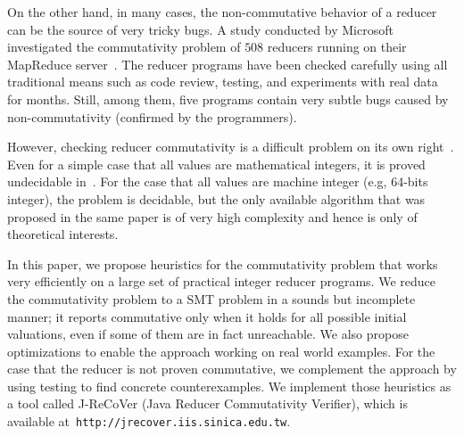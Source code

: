 \documentclass{llncs}
\newcommand{\hide}[1]{}
\begin{document}
\hide{More concretely, for the verification of a MapReduce program, we propose to do it in two phases. First, ensuring if all reducers are commutative. If some reducers are non-commutative, modifying them to commutative ones. Usually, the modification is not a difficult task~\cite{xiao14mr}, and can be done without affecting their functionality and performance. For example, assume that the task of a reducer is to find the name of the person with highest score. Such a reducer is non-commutative when the input include two people with the same highest score. This reducer can be made commutative, by also comparing the ID number of people with the same score. Once all reducers are made commutative, we reduce the verification problem to sequential verification by fixing a scheduler. In this two-phase approach, the key enabling technique is an efficient procedure for checking reducer commutativity.}

On the other hand, in many cases, the non-commutative behavior of a reducer can be the source of very tricky bugs. A study conducted by Microsoft investigated the commutativity problem of $508$ reducers running on their MapReduce server~\cite{xiao14mr}. The reducer programs have been checked carefully using all traditional means such as code review, testing, and experiments with real data for months. Still, among them, five programs contain very subtle bugs caused by non-commutativity (confirmed by the programmers).

However, checking reducer commutativity is a difficult problem on its own right~\cite{ChenHSW15,ChenSW16,ChenLTW17}. Even for a simple case that all values are mathematical integers, it is proved undecidable in~\cite{ChenHSW15}. For the case that all values are machine integer (e.g, 64-bits integer), the problem is decidable, but the only available algorithm that was proposed in the same paper is of very high complexity and hence is only of theoretical interests.

In this paper, we propose heuristics for the commutativity problem that works very efficiently on a large set of practical integer reducer programs. We reduce the commutativity problem to a SMT problem in a sounds but incomplete manner; it  reports commutative only when it holds for all possible initial valuations, even if some of them are in fact unreachable. We also propose optimizations to enable the approach working on real world examples. For the case that the reducer is not proven commutative, we complement the approach by using testing to find concrete counterexamples. We implement those heuristics as a tool called J-ReCoVer (Java Reducer Commutativity Verifier), which is available at~\verb|http://jrecover.iis.sinica.edu.tw|.
\end{document}
